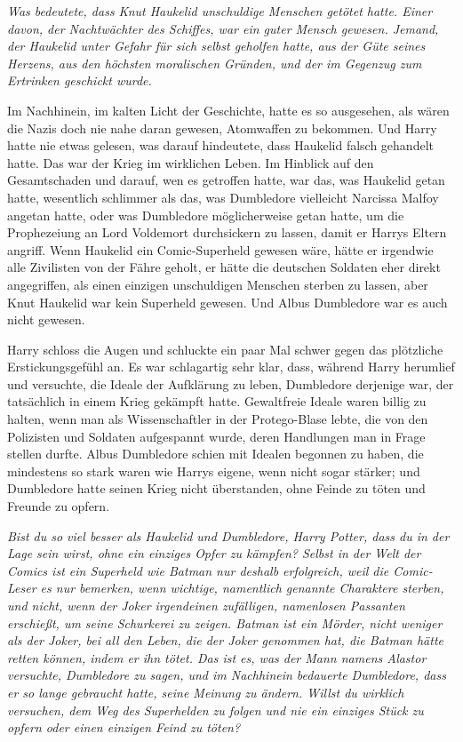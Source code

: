 \emph{Was bedeutete, dass Knut Haukelid unschuldige Menschen getötet hatte. Einer davon, der Nachtwächter des Schiffes, war ein guter Mensch gewesen. Jemand, der Haukelid unter Gefahr für sich selbst geholfen hatte, aus der Güte seines Herzens, aus den höchsten moralischen Gründen, und der im Gegenzug zum Ertrinken geschickt wurde.}

Im Nachhinein, im kalten Licht der Geschichte, hatte es so ausgesehen, als wären
die Nazis doch nie nahe daran gewesen, Atomwaffen zu bekommen. Und Harry hatte
nie etwas gelesen, was darauf hindeutete, dass Haukelid falsch gehandelt hatte.
Das war der Krieg im wirklichen Leben. Im Hinblick auf den Gesamtschaden und
darauf, wen es getroffen hatte, war das, was Haukelid getan hatte, wesentlich
schlimmer als das, was Dumbledore vielleicht Narcissa Malfoy angetan hatte, oder
was Dumbledore möglicherweise getan hatte, um die Prophezeiung an Lord Voldemort
durchsickern zu lassen, damit er Harrys Eltern angriff. Wenn Haukelid ein
Comic-Superheld gewesen wäre, hätte er irgendwie alle Zivilisten von der Fähre
geholt, er hätte die deutschen Soldaten eher direkt angegriffen, als einen
einzigen unschuldigen Menschen sterben zu lassen, aber Knut Haukelid war kein
Superheld gewesen. Und Albus Dumbledore war es auch nicht gewesen.

Harry schloss die Augen und schluckte ein paar Mal schwer gegen das plötzliche
Erstickungsgefühl an. Es war schlagartig sehr klar, dass, während Harry
herumlief und versuchte, die Ideale der Aufklärung zu leben, Dumbledore
derjenige war, der tatsächlich in einem Krieg gekämpft hatte. Gewaltfreie Ideale
waren billig zu halten, wenn man als Wissenschaftler in der Protego-Blase lebte,
die von den Polizisten und Soldaten aufgespannt wurde, deren Handlungen man in
Frage stellen durfte. Albus Dumbledore schien mit Idealen begonnen zu haben, die
mindestens so stark waren wie Harrys eigene, wenn nicht sogar stärker; und
Dumbledore hatte seinen Krieg nicht überstanden, ohne Feinde zu töten und
Freunde zu opfern.

\emph{Bist du so viel besser als Haukelid und Dumbledore, Harry Potter, dass du in der Lage sein wirst, ohne ein einziges Opfer zu kämpfen? Selbst in der Welt der Comics ist ein Superheld wie Batman nur deshalb erfolgreich, weil die Comic-Leser es nur bemerken, wenn wichtige, namentlich genannte Charaktere sterben, und nicht, wenn der Joker irgendeinen zufälligen, namenlosen Passanten erschießt, um seine Schurkerei zu zeigen. Batman ist ein Mörder, nicht weniger als der Joker, bei all den Leben, die der Joker genommen hat, die Batman hätte retten können, indem er ihn tötet. Das ist es, was der Mann namens Alastor versuchte, Dumbledore zu sagen, und im Nachhinein bedauerte Dumbledore, dass er so lange gebraucht hatte, seine Meinung zu ändern. Willst du wirklich versuchen, dem Weg des Superhelden zu folgen und nie ein einziges Stück zu opfern oder einen einzigen Feind zu töten?}

